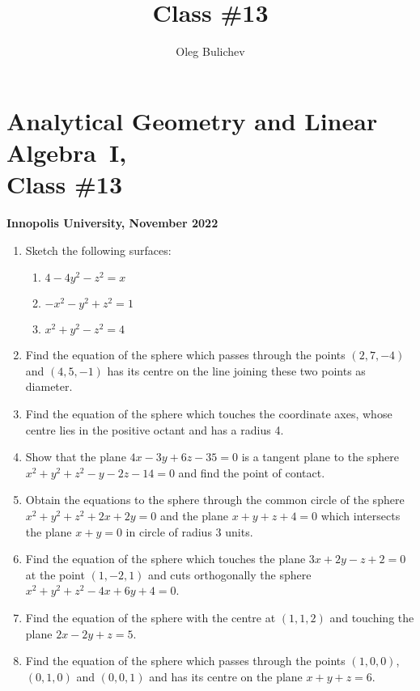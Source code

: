 \documentclass[a4paper,10pt]{article}
\title{Class \#13}
\author{Oleg Bulichev}
\date{}
\begin{document}
\section*{Analytical Geometry and Linear Algebra~I, \\ Class \#13}
\noindent\textbf{Innopolis University, November 2022}
\\

\begin{enumerate}

\item Sketch the following surfaces:
\begin{enumerate}
  \item $4-4y^2-z^2=x$
  \item $-x^2-y^2+z^2=1$
  \item $x^2+y^2-z^2=4$
\end{enumerate}

\item %
Find the equation of the sphere which passes through the points $(2, 7, -4)$ and $(4, 5, -1)$ has its centre on the line joining these two points as diameter. 

\item %
Find the equation of the sphere which touches the coordinate axes, whose centre lies in the positive octant and has a radius 4. 

\item %
Show that the plane $4x - 3y + 6z - 35 = 0$ is a tangent plane to the sphere $x^2 + y^2 + z^2 - y - 2z - 14 = 0$ and find the point of contact. 

\item %
Obtain the equations to the sphere through the common circle of the sphere $x^2 + y^2 + z^2 + 2x + 2y = 0$ and the plane $x + y + z + 4 = 0$ which intersects the plane $x + y = 0$ in circle of radius 3 units.

\item %
Find the equation of the sphere which touches the plane $3x + 2y - z + 2 = 0$ at the point $(1, -2, 1)$ and cuts orthogonally the sphere $x^2 + y^2 + z^2 - 4x + 6y + 4 = 0$.

\item %
Find the equation of the sphere with the centre at $(1, 1, 2)$ and touching the plane $2x - 2y + z = 5$.

\item %
Find the equation of the sphere which passes through the points $(1, 0, 0)$, $(0, 1, 0)$ and $(0, 0, 1)$ and has its centre on the plane $x + y + z = 6$.


\end{enumerate}
\end{document}
